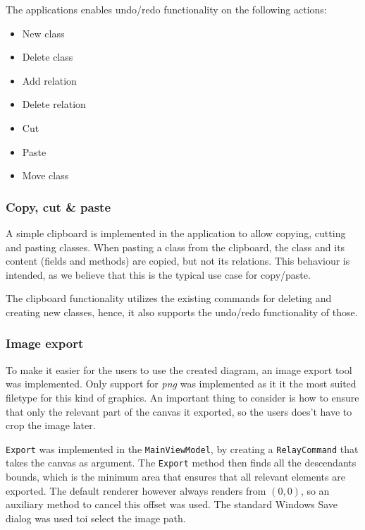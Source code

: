 The applications enables undo/redo functionality on the following actions:


\begin{itemize}
	\item New class
	\item Delete class
	\item Add relation
	\item Delete relation
	\item Cut
	\item Paste
	\item Move class
\end{itemize}


\subsubsection{Copy, cut \& paste}

A simple clipboard is implemented in the
application to allow copying, cutting and pasting classes. When pasting a class
from the clipboard, the class and its content (fields and methods) are copied,
but not its relations. This behaviour is intended, as we believe that this is
the typical use case for copy/paste.

The clipboard functionality utilizes the existing commands for deleting and
creating new classes, hence, it also supports the undo/redo functionality of
those.


\subsubsection{Image export}

To make it easier for the users to use the created diagram, an image export tool
was implemented. Only support for \textit{png} was implemented as it it
the most suited filetype for this kind of graphics. An important thing to consider
is how to ensure that only the relevant part of the canvas it exported, so
the users does't have to crop the image later.

\texttt{Export} was implemented in the \texttt{MainViewModel}, by creating a
\texttt{RelayCommand} that takes the canvas as argument.
The \texttt{Export} method then finds all the  descendants bounds, which is 
the minimum area that ensures that all relevant elements are exported. The
default renderer however always renders from $(0,0)$, so an auxiliary method to
cancel this offset was used. The standard Windows Save dialog was used toi
select the image path.


